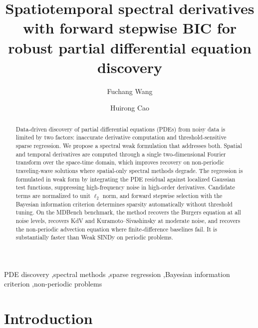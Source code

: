 \documentclass[preprint,12pt]{elsarticle}
\begin{document}
\begin{frontmatter}

\title{Spatiotemporal spectral derivatives with forward stepwise BIC for robust partial differential equation discovery}

\author[1]{Fuchang Wang}
\author[2]{Huirong Cao}

\address[1]{School of Science, Emergency Management University, No. 465 College Road, Sanhe, Hebei 065201, China}
\address[2]{School of Science, Langfang Normal University, No. 100 Ai-min Road, Langfang, Hebei 065000, China}


\begin{abstract}
Data-driven discovery of partial differential equations (PDEs) from noisy data is limited by two factors: inaccurate derivative computation and threshold-sensitive sparse regression. We propose a spectral weak formulation that addresses both. Spatial and temporal derivatives are computed through a single two-dimensional Fourier transform over the space-time domain, which improves recovery on non-periodic traveling-wave solutions where spatial-only spectral methods degrade. The regression is formulated in weak form by integrating the PDE residual against localized Gaussian test functions, suppressing high-frequency noise in high-order derivatives. Candidate terms are normalized to unit $\ell_2$ norm, and forward stepwise selection with the Bayesian information criterion determines sparsity automatically without threshold tuning. On the MDBench benchmark, the method recovers the Burgers equation at all noise levels, recovers KdV and Kuramoto--Sivashinsky at moderate noise, and recovers the non-periodic advection equation where finite-difference baselines fail. It is substantially faster than Weak SINDy on periodic problems.
\end{abstract}

\begin{keyword}
PDE discovery \sep spectral methods \sep sparse regression \sep Bayesian information criterion \sep non-periodic problems
\end{keyword}

\end{frontmatter}

\section{Introduction}
\label{sec:intro}
\end{document}
